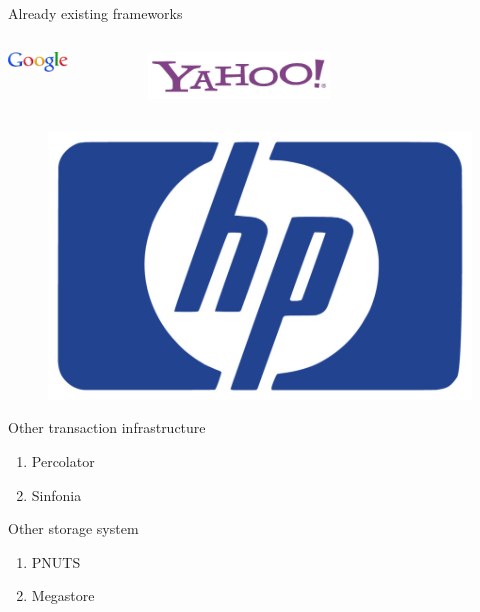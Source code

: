 \documentclass{beamer}
\begin{document}
		\begin{frame}{Already existing frameworks}
	


		
	
	\begin{columns}
	\begin{column}[1]{5cm}
	\includegraphics[width=0.5\textwidth]{img/fig_google.png}
	\end{column}
	\begin{column}[1]{5cm}
	\includegraphics[width=0.5\textwidth]{img/fig_yahoo.png}
	\end{column}
	\end{columns}
		
		
		\begin{figure} [H]
			\centering
			\includegraphics[scale=0.20]{img/fig_hp}
		\end{figure}				

			Other transaction infrastructure					
		
			\begin{enumerate}
			\item Percolator			
			\item Sinfonia
			\end{enumerate}						
				
			\pause			
			
			Other storage system
			\begin{enumerate}
			\item PNUTS
			\item Megastore
			\end{enumerate}		

		\end{frame}
	
\end{document}
